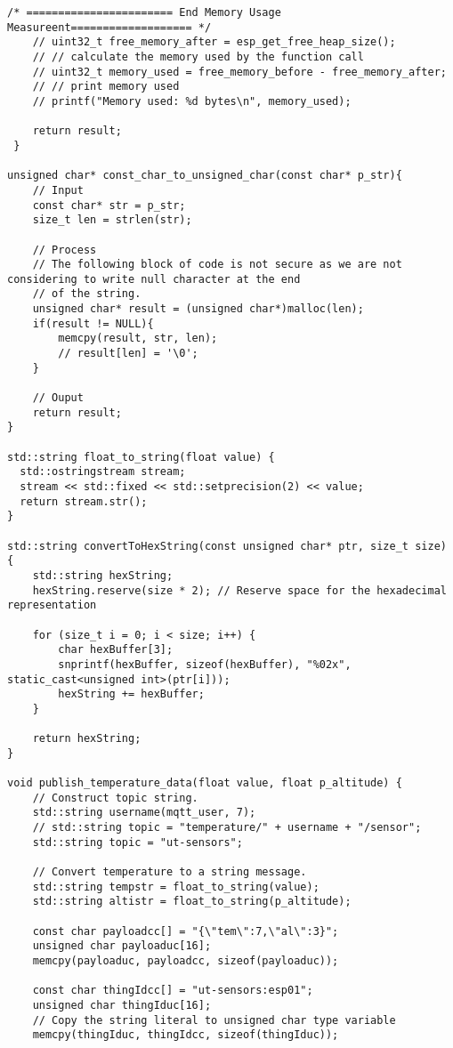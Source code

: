 \begin{lstlisting}[style=CStyle, caption={Main Source C File of The Proposed Implementation}, label={list:mainc-ascon}]
    /* ======================= End Memory Usage  Measureent=================== */
    // uint32_t free_memory_after = esp_get_free_heap_size();
    // // calculate the memory used by the function call
    // uint32_t memory_used = free_memory_before - free_memory_after;
    // // print memory used
    // printf("Memory used: %d bytes\n", memory_used);

    return result;
 }

unsigned char* const_char_to_unsigned_char(const char* p_str){
    // Input
    const char* str = p_str;
    size_t len = strlen(str);

    // Process
    // The following block of code is not secure as we are not considering to write null character at the end 
    // of the string.
    unsigned char* result = (unsigned char*)malloc(len);
    if(result != NULL){
        memcpy(result, str, len);
        // result[len] = '\0';
    }

    // Ouput 
    return result;
}

std::string float_to_string(float value) {
  std::ostringstream stream;
  stream << std::fixed << std::setprecision(2) << value;
  return stream.str();
}

std::string convertToHexString(const unsigned char* ptr, size_t size) {
    std::string hexString;
    hexString.reserve(size * 2); // Reserve space for the hexadecimal representation

    for (size_t i = 0; i < size; i++) {
        char hexBuffer[3];
        snprintf(hexBuffer, sizeof(hexBuffer), "%02x", static_cast<unsigned int>(ptr[i]));
        hexString += hexBuffer;
    }

    return hexString;
}

void publish_temperature_data(float value, float p_altitude) {
    // Construct topic string.
    std::string username(mqtt_user, 7);
    // std::string topic = "temperature/" + username + "/sensor";
    std::string topic = "ut-sensors";

    // Convert temperature to a string message.
    std::string tempstr = float_to_string(value);
    std::string altistr = float_to_string(p_altitude);

    const char payloadcc[] = "{\"tem\":7,\"al\":3}";
    unsigned char payloaduc[16]; 
    memcpy(payloaduc, payloadcc, sizeof(payloaduc));

    const char thingIdcc[] = "ut-sensors:esp01";
    unsigned char thingIduc[16];
    // Copy the string literal to unsigned char type variable 
    memcpy(thingIduc, thingIdcc, sizeof(thingIduc));


\end{lstlisting}
